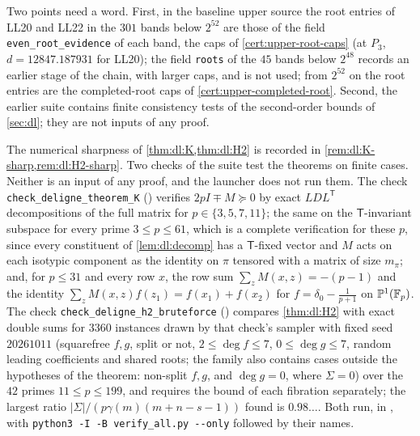 Two points need a word. First, in the baseline upper source the root entries of
LL20 and LL22 in the $301$ bands below $2^{52}$ are those of the field
\texttt{even\_root\_evidence} of each band, the caps of
\cref{cert:upper-root-caps} (at $P_3$, $d=12847.187931$ for LL20); the field
\texttt{roots} of the $45$ bands below $2^{48}$ records an earlier stage of the
chain, with larger caps, and is not used; from $2^{52}$ on the root entries are
the completed-root caps of \cref{cert:upper-completed-root}. Second, the earlier
suite  contains finite consistency tests of the
second-order bounds of \cref{sec:dl}; they are not inputs of any proof.

\begin{remark}
\label{rem:cert:deligne-tests}
The numerical sharpness of \cref{thm:dl:K,thm:dl:H2} is recorded in
\cref{rem:dl:K-sharp,rem:dl:H2-sharp}. Two checks of the suite
 test the theorems on finite cases. Neither is an
input of any proof, and the launcher  does not run
them. The check
\texttt{check\_deligne\_theorem\_K} () verifies
$2pI\mp M\succeq0$ by exact $LDL^{\mathsf T}$ decompositions of the full matrix
for $p\in\{3,5,7,11\}$; the same on the $\mathsf T$-invariant subspace for
every prime $3\le p\le61$, which is a complete verification for these $p$,
since every constituent of \cref{lem:dl:decomp} has a $\mathsf T$-fixed vector
and $M$ acts on each isotypic component as the identity on $\pi$ tensored with
a matrix of size $m_\pi$; and, for $p\le31$ and every row $x$, the row sum
$\sum_zM(x,z)=-(p-1)$ and the identity $\sum_zM(x,z)f(z_1)=f(x_1)+f(x_2)$ for
$f=\delta_0-\frac1{p+1}$ on $\mathbb P^1(\mathbb F_p)$. The check
\texttt{check\_deligne\_h2\_bruteforce} ()
compares \cref{thm:dl:H2} with exact double sums for $3360$
instances drawn by that check's sampler with fixed seed $20261011$
(squarefree $f,g$, split or not, $2\le\deg f\le7$, $0\le\deg g\le7$, random
leading coefficients and shared roots; the family also contains cases outside
the hypotheses of the theorem: non-split $f,g$, and $\deg g=0$, where
$\Sigma=0$) over the $42$ primes $11\le p\le199$, and requires the bound of
each fibration separately; the largest ratio $|\Sigma|/(p\gamma(m)(m+n-s-1))$
found is $0.98\ldots$. Both run, in , with
\texttt{python3 -I -B verify\_all.py -{}-only} followed by their names.
\end{remark}


